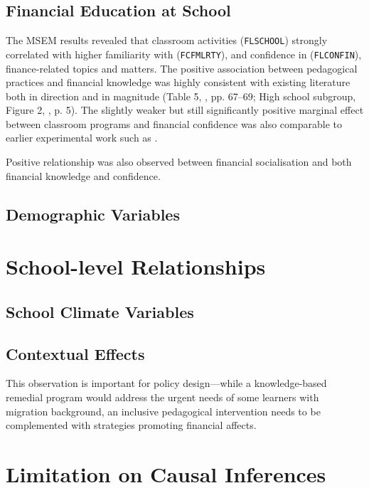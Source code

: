 \documentclass[a4paper,11pt,UKenglish,twoside,openright]{report}\usepackage[]{graphicx}\usepackage[]{color}
\begin{document}
\subsection{Financial Education at School}

The MSEM results revealed that classroom activities (\texttt{FLSCHOOL}) strongly correlated with higher familiarity with (\texttt{FCFMLRTY}), and confidence in (\texttt{FLCONFIN}), finance-related topics and matters. The positive association between pedagogical practices and financial knowledge was highly consistent with existing literature both in direction and in magnitude (Table 5, \textcite{amagir:2018}, pp. 67--69; High school subgroup, Figure 2, \textcite{kaiser:2020}, p. 5). The slightly weaker but still significantly positive marginal effect between classroom programs and financial confidence was also comparable to earlier experimental work such as \textcite{luhrmann:2015}.

Positive relationship was also observed between financial socialisation and both financial knowledge and confidence.

\subsection{Demographic Variables}

\section{School-level Relationships}

\subsection{School Climate Variables}

\subsection{Contextual Effects}



This observation is important for policy design---while a knowledge-based remedial program would address the urgent needs of some learners with migration background, an inclusive pedagogical intervention needs to be complemented with strategies promoting financial affects.

\section{Limitation on Causal Inferences}
\end{document}
